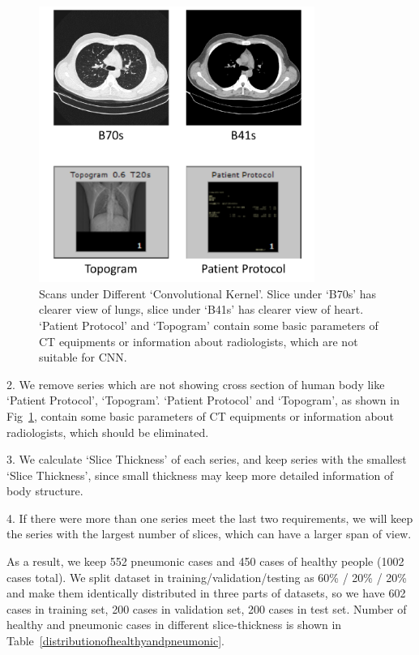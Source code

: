 \begin{figure}[t]
    \centerline{\includegraphics[width=90mm]{Bs.pdf}}
    \vspace{-0cm}
    \caption{Scans under Different `Convolutional Kernel'. Slice under `B70s' has clearer view of lungs, slice under `B41s' has clearer view of heart. `Patient Protocol' and `Topogram' contain some basic parameters of CT equipments or information about radiologists, which are not suitable for CNN.}
    \vspace{-0cm}
    \label{Bs}
    \end{figure}

2. We remove series which are not showing cross section of human body like `Patient Protocol', `Topogram'. `Patient Protocol' and `Topogram', as shown in Fig~\ref{Bs}, contain some basic parameters of CT equipments or information about radiologists, which should be eliminated.

3. We calculate `Slice Thickness' of each series, and keep series with the smallest `Slice Thickness', since small thickness may keep more detailed information of body structure. 

4. If there were more than one series meet the last two requirements, we will keep the series with the largest number of slices, which can have a larger span of view.

As a result, we keep 552 pneumonic cases and 450 cases of healthy people (1002 cases total).
We split dataset in training/validation/testing as 60\% / 20\% / 20\% and make them identically distributed in three parts of datasets, so we have 602 cases in training set, 200 cases in validation set, 200 cases in test set.
Number of healthy and pneumonic cases in different slice-thickness is shown in Table~\ref{distributionofhealthyandpneumonic}.


